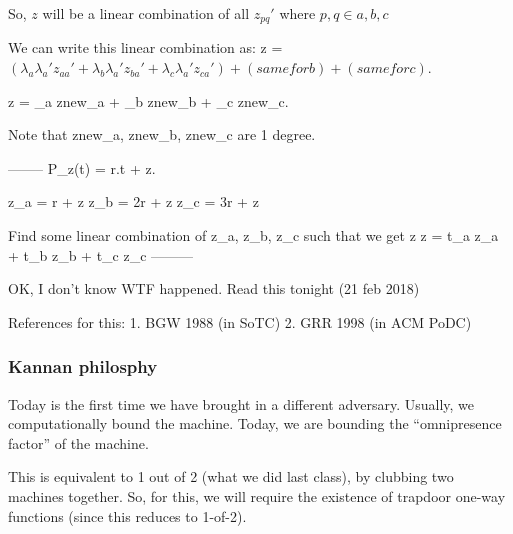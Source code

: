 So, $z$ will be a linear combination of all $z_{pq}'$ where $p, q \in {a, b, c}$

We can write this linear combination as:
z = $(\lambda_a \lambda_a' z_{aa}' +
     \lambda_b \lambda_a' z_{ba}' +
     \lambda_c \lambda_a' z_{ca}') +
     (same for b) +
     (same for c)$.

z = \lambda_a znew_a + \lambda_b znew_b + \lambda_c znew_c.

Note that znew_a, znew_b, znew_c are 1 degree.



--------
P_z(t) = r.t + z.

z_a = r + z
z_b = 2r + z
z_c = 3r + z

Find some linear combination of z_a, z_b, z_c such that we get z
z = t_a z_a + t_b z_b + t_c z_c
---------

OK, I don't know WTF happened. Read this tonight (21 feb 2018)



References for this:
1. BGW 1988 (in SoTC)
2. GRR 1998 (in ACM PoDC)

\subsubsection{Kannan philosphy}
Today is the first time we have brought in a different adversary. Usually, we computationally bound the machine.
Today, we are bounding the ``omnipresence factor'' of the machine.


This is equivalent to 1 out of 2 (what we did last class), by clubbing two machines together.
So, for this, we will require the existence of trapdoor one-way functions (since this reduces to 1-of-2).


